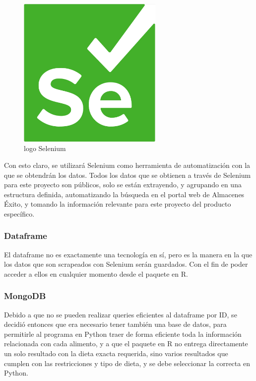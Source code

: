 \begin{figure}[H]
        \centering
        \includegraphics[width=7cm]{img/metodologia/Selenium_Logo.png}
        \caption{logo Selenium}
        \label{fig:logoSelenium}
    \end{figure}

Con esto claro, se utilizar\'a Selenium como herramienta de automatizaci\'on con la que se obtendr\'an los datos. Todos los datos que se obtienen a trav\'es de Selenium para este proyecto son p\'ublicos, solo se est\'an extrayendo, y agrupando en una estructura definida, automatizando la b\'usqueda en el portal web de Almacenes \'Exito, y tomando la informaci\'on relevante para este proyecto del producto espec\'ifico.

\subsubsection{Dataframe}
\noindent El dataframe no es exactamente una tecnolog\'ia en s\'i, pero es la manera en la que los datos que son scrapeados con Selenium ser\'an guardados. Con el fin de poder acceder a ellos en cualquier momento desde el paquete en R.

\subsubsection{MongoDB}
\noindent Debido a que no se pueden  realizar queries eficientes al dataframe por ID, se decidi\'o entonces que era necesario tener tambi\'en una base de datos, para permitirle al programa en Python traer de forma eficiente toda la informaci\'on relacionada con cada alimento, y a que el paquete en R no entrega directamente un solo resultado con la dieta exacta requerida, sino varios resultados que cumplen con las restricciones y tipo de dieta, y se debe seleccionar la correcta en Python.


